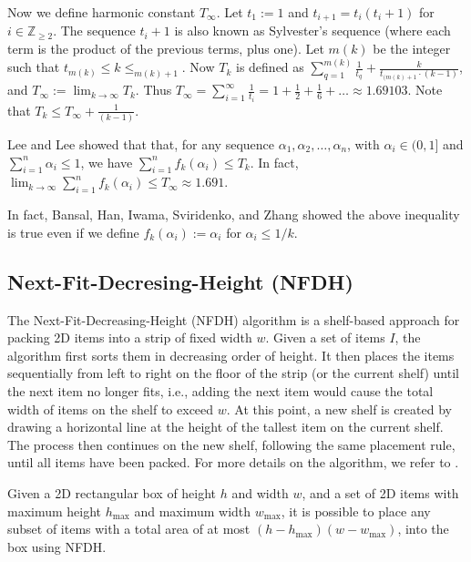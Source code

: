 \documentclass[a4paper,UKenglish,cleveref, autoref, thm-restate]{lipics-v2021}
\begin{document}
Now we define harmonic constant $T_{\infty}$.
Let $t_1:=1$ and $t_{i+1}=t_i(t_i+1)$ for $i \in \mathbb{Z}_{\ge 2}$. 
The sequence $t_i+1$ is also known as Sylvester's sequence (where each term is the product of the previous terms, plus one).
Let $m(k)$ be the integer such that $t_{m(k)}\le k \le _{m(k)+1}$.
Now $T_k$ is defined as $\sum_{q=1}^{m(k)}\frac{1}{t_q}+\frac{k}{t_{(m(k)+1}\cdot (k-1)}$, and $T_{\infty}:=\lim_{k \rightarrow \infty} T_k$.
Thus $T_{\infty}=\sum_{i=1}^{\infty} \frac{1}{t_i}=1+\frac12+\frac16+\dots \approx 1.69103$.
 Note that $T_k \le T_{\infty}+\frac{1}{(k-1)}$.


Lee and Lee \cite{LeeL85} showed that that, for any sequence $\alpha_1, \alpha_2, \dots, \alpha_n$, with $\alpha_i \in (0,1]$ and $\sum_{i=1}^n \alpha_i \le 1$,
we have $ \sum_{i=1}^n  f_k(\alpha_i) \le T_{k}$.  
In fact, $\lim_{k \rightarrow \infty} \sum_{i=1}^n  f_k(\alpha_i) \le T_{\infty} \approx 1.691$. 

In fact, Bansal, Han, Iwama, Sviridenko, and Zhang \cite{bansal2007harmonic} showed the above inequality is true even if we define $f_k(\alpha_i):=\alpha_i$ for $\alpha_i \le 1/k$.


\subsection{Next-Fit-Decresing-Height (NFDH)}
\label{appx:NFDH}

The Next-Fit-Decreasing-Height (NFDH) algorithm is a shelf-based approach for packing 2D items into a strip of fixed width $w$. Given a set of items $I$, the algorithm first sorts them in decreasing order of height.
It then places the items sequentially from left to right on the floor of the strip (or the current shelf) until the next item no longer fits, i.e., adding the next item would cause the total width of items on the shelf to exceed $w$. At this point, a new shelf is created by drawing a horizontal line at the height of the tallest item on the current shelf. The process then continues on the new shelf, following the same placement rule, until all items have been packed.
For more details on the algorithm, we refer to \cite{coffman1980performance, christensen2016multidimensional}.


\begin{lemma}
\label{lem:NFDH}
Given a 2D rectangular box of height $h$ and width $w$, and a set of 2D items with maximum height $h_{\max}$ and maximum width $w_{\max}$, it is possible to place any subset of items with a total area of at most $(h-h_{\max})(w-w_{\max})$, into the box using NFDH.
\end{lemma}
\end{document}
